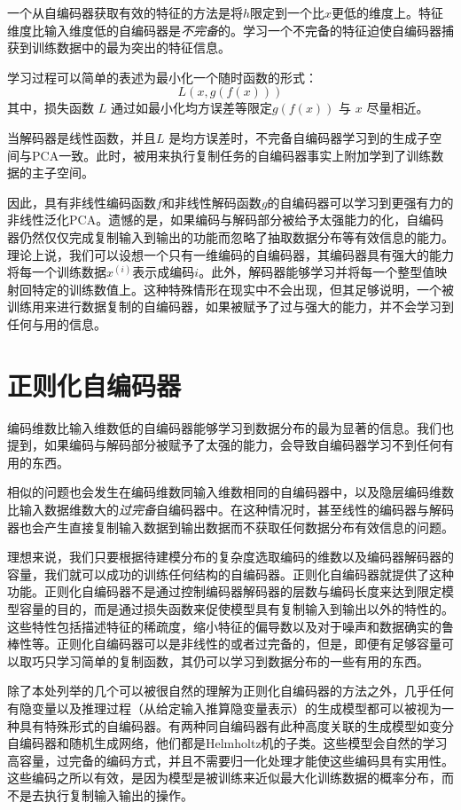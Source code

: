 一个从自编码器获取有效的特征的方法是将$h$限定到一个比$x$更低的维度上。特征维度比输入维度低的自编码器是\emph{不完备}的。学习一个不完备的特征迫使自编码器捕获到训练数据中的最为突出的特征信息。

学习过程可以简单的表述为最小化一个随时函数的形式：
\begin{equation}
	L(x,g(f(x)))
\end{equation}
其中，损失函数 $L$ 通过如最小化均方误差等限定$g(f(x))$ 与 $x$ 尽量相近。 

当解码器是线性函数，并且$L$ 是均方误差时，不完备自编码器学习到的生成子空间与PCA一致。此时，被用来执行复制任务的自编码器事实上附加学到了训练数据的主子空间。

因此，具有非线性编码函数$f$和非线性解码函数$g$的自编码器可以学习到更强有力的非线性泛化PCA。遗憾的是，如果编码与解码部分被给予太强能力的化，自编码器仍然仅仅完成复制输入到输出的功能而忽略了抽取数据分布等有效信息的能力。理论上说，我们可以设想一个只有一维编码的自编码器，其编码器具有强大的能力将每一个训练数据$x^{(i)}$表示成编码$i$。此外，解码器能够学习并将每一个整型值映射回特定的训练数值上。这种特殊情形在现实中不会出现，但其足够说明，一个被训练用来进行数据复制的自编码器，如果被赋予了过与强大的能力，并不会学习到任何与用的信息。

\section{正则化自编码器}
\label{sec:14.2}
编码维数比输入维数低的自编码器能够学习到数据分布的最为显著的信息。我们也提到，如果编码与解码部分被赋予了太强的能力，会导致自编码器学习不到任何有用的东西。

相似的问题也会发生在编码维数同输入维数相同的自编码器中，以及隐层编码维数比输入数据维数大的\emph{过完备}自编码器中。在这种情况时，甚至线性的编码器与解码器也会产生直接复制输入数据到输出数据而不获取任何数据分布有效信息的问题。

理想来说，我们只要根据待建模分布的复杂度选取编码的维数以及编码器解码器的容量，我们就可以成功的训练任何结构的自编码器。正则化自编码器就提供了这种功能。正则化自编码器不是通过控制编码器解码器的层数与编码长度来达到限定模型容量的目的，而是通过损失函数来促使模型具有复制输入到输出以外的特性的。这些特性包括描述特征的稀疏度，缩小特征的偏导数以及对于噪声和数据确实的鲁棒性等。正则化自编码器可以是非线性的或者过完备的，但是，即便有足够容量可以取巧只学习简单的复制函数，其仍可以学习到数据分布的一些有用的东西。

除了本处列举的几个可以被很自然的理解为正则化自编码器的方法之外，几乎任何有隐变量以及推理过程（从给定输入推算隐变量表示）的生成模型都可以被视为一种具有特殊形式的自编码器。有两种同自编码器有此种高度关联的生成模型如变分自编码器和随机生成网络，他们都是Helmholtz机的子类。这些模型会自然的学习高容量，过完备的编码方式，并且不需要归一化处理才能使这些编码具有实用性。这些编码之所以有效，是因为模型是被训练来近似最大化训练数据的概率分布，而不是去执行复制输入输出的操作。

